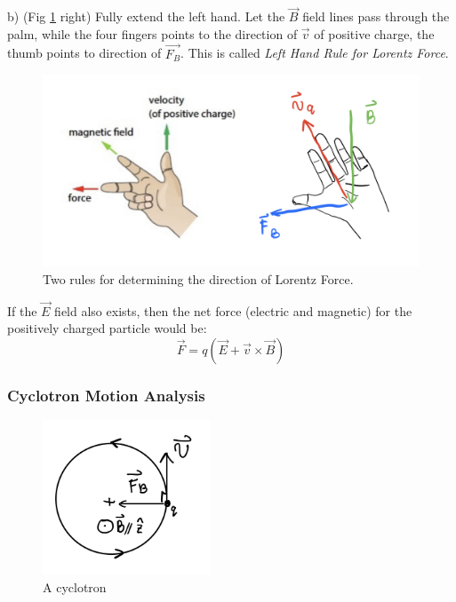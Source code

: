 \documentclass[12pt,a4paper,twoside]{article}
\begin{document}
\begin{itemize}
            \subitem b) (Fig \ref{fig:lorentz-dir} right) Fully extend the left hand. Let the $\overrightarrow{B}$ field lines pass through the palm, while the four fingers points to the direction of $\overrightarrow{v}$ of positive charge, the thumb points to direction of $\overrightarrow{F_B}$. This is called \textit{Left Hand Rule for Lorentz Force}.
            \begin{figure}[ht]
                \centering
                \includegraphics[width=12cm]{250-Revision/lorentz-force-dir.png}
                \caption{Two rules for determining the direction of Lorentz Force.}
                \label{fig:lorentz-dir}
            \end{figure}
        
    \end{itemize}
    If the $\overrightarrow{E}$ field also exists, then the net force (electric and magnetic) for the positively charged particle would be:
    \begin{equation}
        \overrightarrow{F}=q(\overrightarrow{E}+\overrightarrow{v}\times \overrightarrow{B})
    \end{equation}

\subsubsection{Cyclotron Motion Analysis}
    \begin{figure}[ht]
        \centering
        \includegraphics[width=5cm]{250-Revision/cyclotron.png}
        \caption{A cyclotron}
        \label{fig:cyclotron}
    \end{figure}
    
\end{document}
